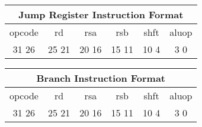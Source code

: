 \documentclass[letterpaper, 11pt]{article}
\begin{document}
\begin{center}
		\begin{tabular}{|c|c|c|c|c|c|}
			\multicolumn{6}{c}{Jump Register Instruction Format}\\ \hline
				\hspace{2pt} opcode \hspace{2pt} & \hspace{5pt} rd \hspace{5pt} &  \hspace{4pt} rsa \hspace{4pt} & \hspace{4pt}rsb  \hspace{4pt}& \hspace{10pt}shft  \hspace{10pt} & \hspace{3pt} aluop \hspace{3pt}   \\	\hline
			31 \hfill 26& 25 \hfill 21 &20 \hfill  16& 15 \hfill  11&10 \hfill   4&3 \hfill   0\\ \hline
		
	\end{tabular}
\end{center}

\begin{center}
		\begin{tabular}{|c|c|c|c|c|c|}
			\multicolumn{6}{c}{Branch Instruction Format}\\ \hline
				\hspace{2pt} opcode \hspace{2pt} & \hspace{5pt} rd \hspace{5pt} &  \hspace{4pt} rsa \hspace{4pt} & \hspace{4pt}rsb  \hspace{4pt}& \hspace{10pt}shft  \hspace{10pt} & \hspace{3pt} aluop \hspace{3pt}   \\	\hline
			31 \hfill 26& 25 \hfill 21 &20 \hfill  16& 15 \hfill  11&10 \hfill   4&3 \hfill   0\\ \hline
		
	\end{tabular}
\end{center}
\end{document}
